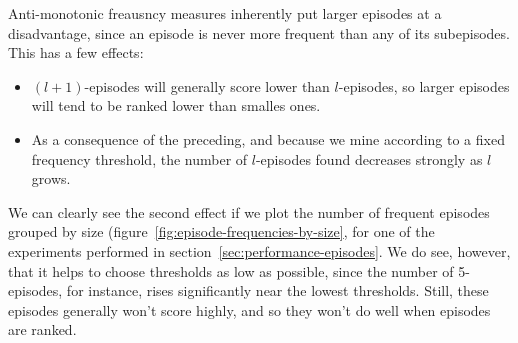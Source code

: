 Anti-monotonic freausncy measures inherently put larger episodes at a disadvantage, since an episode is never more frequent than any of its subepisodes. This has a few effects:
\begin{itemize}
\item $ (l + 1) $-episodes will generally score lower than $ l $-episodes, so larger episodes will tend to be ranked lower than smalles ones.
\item As a consequence of the preceding, and because we mine according to a fixed frequency threshold, the number of $ l $-episodes found decreases strongly as $ l $ grows.
\end{itemize}
We can clearly see the second effect if we plot the number of frequent episodes grouped by size (figure~\ref{fig:episode-frequencies-by-size}, for one of the experiments performed in section~\ref{sec:performance-episodes}. We do see, however, that it helps to choose thresholds as low as possible, since the number of 5-episodes, for instance, rises significantly near the lowest thresholds. Still, these episodes generally won't score highly, and so they won't do well when episodes are ranked.


